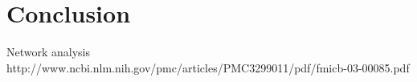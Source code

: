\section{Conclusion}


Network analysis
http://www.ncbi.nlm.nih.gov/pmc/articles/PMC3299011/pdf/fmicb-03-00085.pdf

% 
%
%
%
%
%
%
%
%
%
%
%
%
%
%
%
%
%
%
%
%
%
%
%
